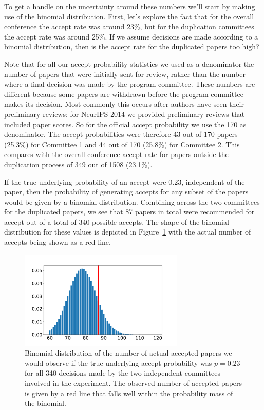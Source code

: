 To get a handle on the uncertainty around these numbers we'll start by
making use of the
binomial distribution.
First, let's explore the fact that for the overall conference the accept
rate was around 23\%, but for the duplication committees the accept rate
was around 25\%. If we assume decisions are made according to a binomial
distribution, then is the accept rate for the duplicated papers too
high?

Note that for all our accept probability statistics we used as a
denominator the number of papers that were initially sent for review,
rather than the number where a final decision was made by the program
committee. These numbers are different because some papers are withdrawn
before the program committee makes its decision. Most commonly this
occurs after authors have seen their preliminary reviews: for NeurIPS 2014
we provided preliminary reviews that included paper scores. So for the
official accept probability we use the 170 as denominator. The accept
probabilities were therefore 43 out of 170 papers (25.3\%) for Committee
1 and 44 out of 170 (25.8\%) for Committee 2. This compares with the
overall conference accept rate for papers outside the duplication
process of 349 out of 1508 (23.1\%).

If the true underlying probability of an accept were 0.23, independent
of the paper, then the probability of generating accepts for any subset
of the papers would be given by a binomial distribution. Combining
across the two committees for the duplicated papers, we see that 87
papers in total were recommended for accept out of a total of 340
possible accepts. The shape of the binomial distribution for these values is 
depicted in Figure~\ref{fig:uncertainty-accept-rate} with the actual number of accepts being shown as a red line.


\begin{figure}[htb]
\centering
\includegraphics[width=0.70\textwidth]{diagrams/neurips/uncertainty-accept-rate.pdf}


\caption{Binomial distribution of the number of actual accepted papers we would observe if the true underlying accept probability was $p=0.23$ for all 340 decisions made by the two independent committees involved in the experiment. The observed number of accepted papers is given by a red line that falls well within the probability mass of the binomial.}
\label{fig:uncertainty-accept-rate}
\end{figure}

